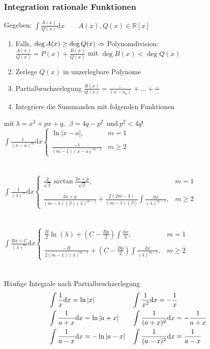 \documentclass[german]{latex4ei/latex4ei_sheet}
\begin{document}
\begin{sectionbox}
    \subsubsection{Integration rationale Funktionen}
    Gegeben: $\int \frac{A(x)}{Q(x)} \mathrm dx \qquad A(x),Q(x)\in \mathbb R[x]$
    \begin{enumerate}\itemsep0pt
    \item Falls, $\deg A(x) \ge \deg Q(x) \Rightarrow$ Polynomdivision: \\ $\frac{A(x)}{Q(x)} = P(x) + \frac{B(x)}{Q(x)}$ mit $\deg B(x) < \deg Q(x)$
    \item Zerlege $Q(x)$ in unzerlegbare Polynome
    \item Partialbruchzerlegung $\frac{B(x)}{Q(x)} = \frac{\ldots}{(x - a_n)} + \ldots + \frac{\ldots}{\ldots}$
    \item Integriere die Summanden mit folgenden Funktionen
    \end{enumerate}
    
    $\text{mit} ~ \lambda=x^2+px+q, ~~ \beta=4q-p^2 ~~ \text{und} ~p^2<4q$!
    $\int\frac{1}{(x-a)^m}\mathrm dx \begin{cases} \ln\left|x-a\right|, & m=1\\ \\ \frac{-1}{(m-1)(x-a)^{m-1}} &m\geq2 \end{cases}$\\ \\ \\
    $\int\frac{1}{(\lambda)^m} \mathrm dx \begin{cases} \frac{2}{\sqrt{\beta}} \arctan\frac{2x+p}{\sqrt{\beta}}, &m=1\\ \\ \frac{2x+p}{(m-1)(\beta)(\lambda)^{m-1}}+\frac{2(2m-3)}{(m-1)(\beta)} \int\frac{\mathrm dx}{(\lambda)^{m-1}}, &m\geq2 \end{cases}$\\ \\ \\
    $\int\frac{Bx+C}{(\lambda)^m} \mathrm dx \begin{cases} \frac{B}{2} \ln(\lambda) + (C-\frac{Bp}{2}) \int\frac{\mathrm dx}{\lambda}, &m=1\\ \\ \frac{-B}{2(m-1)(\lambda)^{m-1}} + (C-\frac{Bp}{2}) \int\frac{\mathrm dx}{(\lambda)^{m-1}}, &m\geq2 \end{cases}$\\ \\ \\
    Häufige Integrale nach Partialbruchzerlegung
    \begin{align*}
    &\int\frac{1}{x}\mathrm dx = \ln\left\vert x\right\vert&&\int\frac{1}{x^2}\mathrm dx = -\frac{1}{x} \\
    &\int\frac{1}{a+x}\mathrm dx = \ln\left\vert a+x\right\vert && \int\frac{1}{(a+x)^2}\mathrm dx = -\frac{1}{a+x} \\
    &\int\frac{1}{a-x}\mathrm dx = -\ln\left\vert a-x\right\vert && \int\frac{1}{(a-x)^2}\mathrm dx = \frac{1}{a-x}
    \end{align*}

\end{sectionbox}
\end{document}
